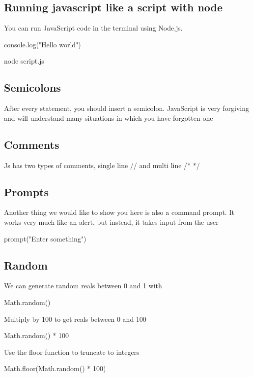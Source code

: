 \documentclass{report}
\begin{document}
    \bigbreak \noindent 
    \subsection{Running javascript like a script with node}
    \bigbreak \noindent 
    You can run JavaScript code in the terminal using Node.js.
    \bigbreak \noindent 
    \begin{jscode}
    console.log("Hello world")
    \end{jscode}
    \bigbreak \noindent 
    \begin{bashcode}
    node script.js
    \end{bashcode}



    \bigbreak \noindent 
    \subsection{Semicolons}
    \bigbreak \noindent 
    After every statement, you should insert a semicolon. JavaScript is very forgiving and will understand many situations in which you have forgotten one
    \bigbreak \noindent 
    \subsection{Comments}
    \bigbreak \noindent 
    Js has two types of comments, single line // and multi line /* */

    \bigbreak \noindent 
    \subsection{Prompts}
    \bigbreak \noindent 
    Another thing we would like to show you here is also a command prompt. It works very much like an alert, but instead, it takes input from the user
    \bigbreak \noindent 
    \begin{jscode}
    prompt("Enter something")
    \end{jscode}

    \bigbreak \noindent 
    \subsection{Random}
    \bigbreak \noindent 
    We can generate random reals between 0 and 1 with
    \bigbreak \noindent 
    \begin{jscode}
    Math.random()
    \end{jscode}
    \bigbreak \noindent 
    Multiply by 100 to get reals between 0 and 100
    \bigbreak \noindent 
    \begin{jscode}
    Math.random() * 100
    \end{jscode}
    \bigbreak \noindent 
    Use the floor function to truncate to integers
    \bigbreak \noindent 
    \begin{jscode}
    Math.floor(Math.random() * 100)
    \end{jscode}
\end{document}
